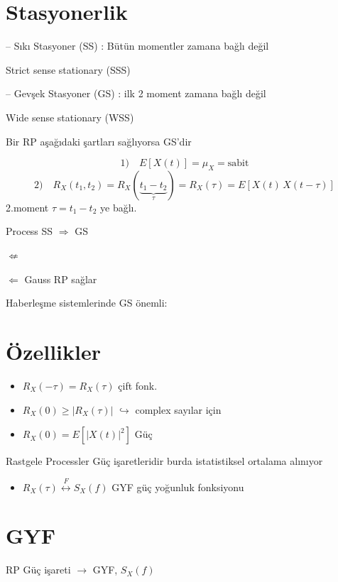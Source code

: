 \documentclass[11pt,a4paper]{article}
\begin{document}
\section{Stasyonerlik}

\textcolor{kirmizikalem}{-- Sıkı Stasyoner (SS)} \quad : Bütün momentler zamana bağlı değil

Strict sense stationary (SSS)

\textcolor{kirmizikalem}{-- Gevşek Stasyoner (GS)} \quad : ilk 2 moment zamana bağlı değil

Wide sense stationary (WSS)

Bir RP aşağıdaki şartları sağlıyorsa GS'dir

\[ \text{1)}\quad E[X(t)]=\mu_X=\text{sabit} \]
\[ \text{2)}\quad R_X(t_1,t_2)=R_X(\underbrace{t_1-t_2}_{\tau})=R_X(\tau)=E[X(t)\,X(t-\tau)] \]
2.moment $\tau=t_1-t_2$ ye bağlı.

Process \qquad SS $\Rightarrow$ GS

\qquad\qquad\qquad\quad $\not\Leftarrow$

\qquad\qquad\qquad\quad $\Leftarrow$ Gauss RP sağlar

Haberleşme sistemlerinde GS önemli:

\section{Özellikler}

\begin{itemize}
\item $R_X(-\tau)=R_X(\tau)$ \quad çift fonk.
\item $R_X(0)\ge|R_X(\tau)|$ $\hookrightarrow$ complex sayılar için
\item $R_X(0)=E\left[|X(t)|^2\right]$ \quad Güç
\end{itemize}

Rastgele Processler Güç işaretleridir burda istatistiksel ortalama alınıyor

\begin{itemize}
\item $R_X(\tau)\overset{F}{\longleftrightarrow}S_X(f)$ \quad GYF \quad güç yoğunluk fonksiyonu
\end{itemize}

\section{GYF}

RP Güç işareti $\rightarrow$ GYF, $S_X(f)$
\end{document}
